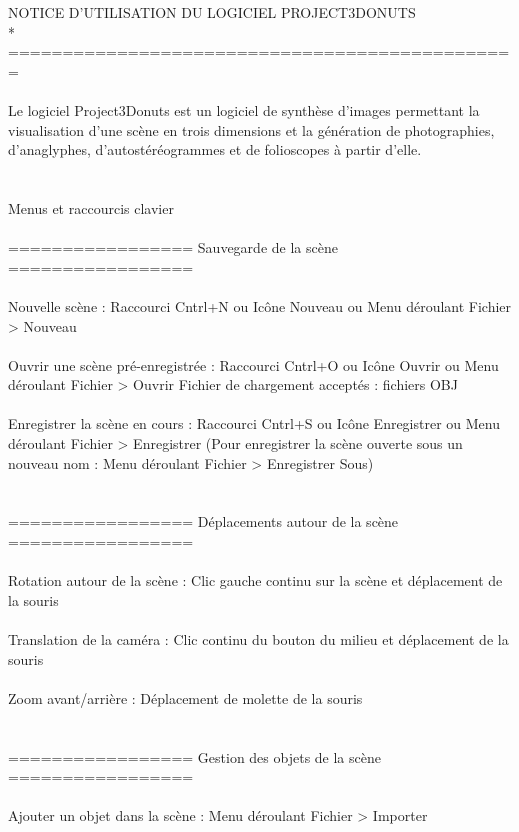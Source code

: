 NOTICE D'UTILISATION DU LOGICIEL PROJECT3DONUTS\\*
===============================================
\\ \\
Le logiciel Project3Donuts est un logiciel de synthèse d'images permettant la visualisation d'une scène en trois dimensions et la génération de photographies, d'anaglyphes, d'autostéréogrammes et de folioscopes à partir d'elle.
\\ \\ \\
Menus et raccourcis clavier
\\ \\
================= Sauvegarde de la scène =================
\\ \\
Nouvelle scène :			Raccourci Cntrl+N     
	       	 			ou     Icône Nouveau     
		 			ou     Menu déroulant Fichier > Nouveau
\\ \\
Ouvrir une scène pré-enregistrée : 	Raccourci Cntrl+O
       	   	 		   	ou      Icône Ouvrir
				   	ou	Menu déroulant Fichier > Ouvrir
		Fichier de chargement acceptés : fichiers OBJ
\\ \\
Enregistrer la scène en cours :       	Raccourci Cntrl+S
	       	     	      		ou 	Icône Enregistrer
					ou 	Menu déroulant Fichier > Enregistrer
		(Pour enregistrer la scène ouverte sous un nouveau nom : Menu déroulant Fichier > Enregistrer Sous)
\\ \\ \\
================= Déplacements autour de la scène =================
\\ \\
Rotation autour de la scène :  	        Clic gauche continu sur la scène et déplacement de la souris
\\ \\
Translation de la caméra :                    Clic continu du bouton du milieu et déplacement de la souris
\\ \\
Zoom avant/arrière :  	    		Déplacement de molette de la souris
\\ \\ \\
================= Gestion des objets de la scène =================
\\ \\
Ajouter un objet dans la scène : 	Menu déroulant Fichier > Importer
